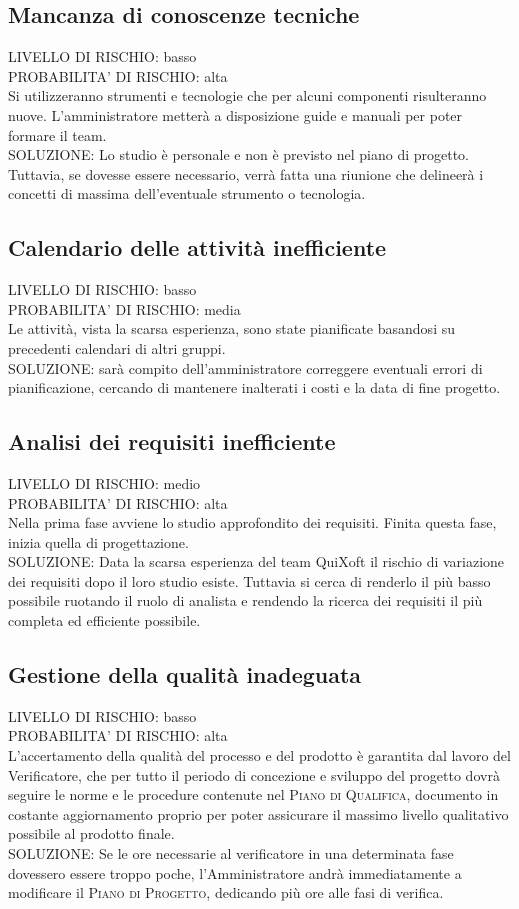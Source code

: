 \documentclass[11pt,a4paper]{article}
\begin{document}
\subsection{Mancanza di conoscenze tecniche}
LIVELLO DI RISCHIO: basso \\
PROBABILITA' DI RISCHIO: alta \\
Si utilizzeranno strumenti e tecnologie che per alcuni componenti risulteranno nuove.
L'amministratore metterà a disposizione guide e manuali per poter formare il team. \\
SOLUZIONE: Lo studio è personale e non è previsto nel piano di progetto.
Tuttavia, se dovesse essere necessario, verrà fatta una riunione che delineerà i concetti di massima dell'eventuale strumento o tecnologia.
\subsection{Calendario delle attività inefficiente}
LIVELLO DI RISCHIO: basso \\
PROBABILITA' DI RISCHIO: media \\
Le attività, vista la scarsa esperienza, sono state pianificate basandosi su precedenti calendari di altri gruppi. \\
SOLUZIONE: sarà compito dell'amministratore correggere eventuali errori di pianificazione, cercando di mantenere inalterati i costi e la data di fine progetto.
\subsection{Analisi dei requisiti inefficiente}
LIVELLO DI RISCHIO: medio \\
PROBABILITA' DI RISCHIO: alta \\
Nella prima fase avviene lo studio approfondito dei requisiti.
Finita questa fase, inizia quella di progettazione. \\
SOLUZIONE: Data la scarsa esperienza del team QuiXoft il rischio di variazione dei requisiti dopo il loro studio esiste. Tuttavia si cerca di renderlo il più basso possibile ruotando il ruolo di analista e rendendo la ricerca dei requisiti il più completa ed efficiente possibile.
\subsection{Gestione della qualità inadeguata}
LIVELLO DI RISCHIO: basso \\
PROBABILITA' DI RISCHIO: alta \\
L'accertamento della qualità del processo e del prodotto è garantita dal lavoro del Verificatore, che per tutto il periodo di concezione e sviluppo del progetto dovrà seguire le norme e le procedure contenute nel \textsc{Piano di Qualifica}, documento in costante aggiornamento proprio per poter assicurare il massimo livello qualitativo possibile al prodotto finale. \\
SOLUZIONE: Se le ore necessarie al verificatore in una determinata fase dovessero essere troppo poche, l'Amministratore andrà immediatamente a modificare il \textsc{Piano di Progetto}, dedicando più ore alle fasi di verifica.
\end{document}
